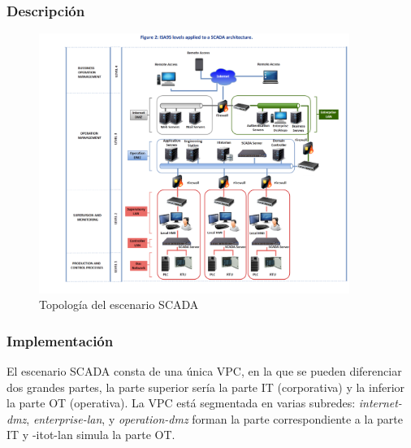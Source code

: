 \subsubsection{Descripción}

  \begin{figure}[h]
  \centering
  \includegraphics[width=0.9\textwidth]{../imgs/desarrollo/escenarios-de-red/SCADA/SCADA_Network_2.PNG}
  \caption{Topología del escenario SCADA}
  \label{fig:scada-t}
  \end{figure}

  \clearpage
\subsubsection{Implementación}
  El escenario SCADA consta de una única VPC, en la que se pueden diferenciar dos grandes partes, la parte superior sería la parte IT (corporativa) y la inferior la parte OT (operativa). La VPC está segmentada en varias subredes: \textit{internet-dmz}, \textit{enterprise-lan}, y \textit{operation-dmz} forman la parte correspondiente a la parte IT y \text-it{ot-lan} simula la parte OT. 


